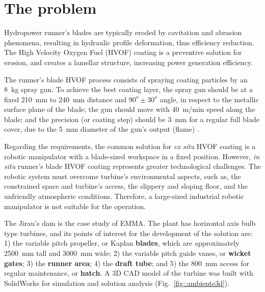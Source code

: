 \section{The problem}\label{problem}

Hydropower runner's blades are typically eroded by cavitation and abrasion
phenomena, resulting in hydraulic profile deformation, thus efficiency
reduction. The High Velocity Oxygen Fuel (HVOF) coating is a preventive
solution for erosion, and creates a lamellar structure, increasing
power generation efficiency. 

The runner's blade HVOF process consists of spraying coating particles
by an 8~kg spray gun. To achieve the best coating layer, the spray gun should be at a
fixed 210~mm to 240~mm distance and $90^o \pm 30^o$ angle, in respect
to the metallic surface plane of the blade; the gun should move with 40~m/min
speed along the blade; and the precision (or coating step) should be 3~mm for a
regular full blade cover, due to the 5~mm diameter of the gun's output (flame)
\cite{li2002effect}.

Regarding the requirements, the common solution for \textit{ex situ} HVOF
coating is a robotic manipulator with a blade-sized workspace in a fixed
position. However, \textit{in situ} runner's blade HVOF coating represents
greater technological challenges. The robotic system must overcome
turbine's environmental aspects, such as, the constrained space and turbine's
access, the slippery and sloping floor, and the unfriendly atmospheric
conditions. Therefore, a large-sized industrial robotic manipulator is not
suitable for the operation.

The Jirau's dam is the case study of EMMA. The plant has horizontal
axis bulb type turbines, and its points of interest for the
development of the solution are: 1) the variable pitch propeller, or Kaplan
\textbf{blades}, which are approximately 2500~mm tall and 3000~mm wide; 2) the
variable pitch guide vanes, or \textbf{wicket gates}; 3) the \textbf{runner
area}; 4) the \textbf{draft tube}; and 5) the 800~mm access for regular
maintenance, or \textbf{hatch}. A 3D CAD model of the turbine was built with
SolidWorks\raisebox{1ex}{\textregistered} for simulation and solution analysis
(Fig.~\ref{fig::ambiente3d}). 
 

